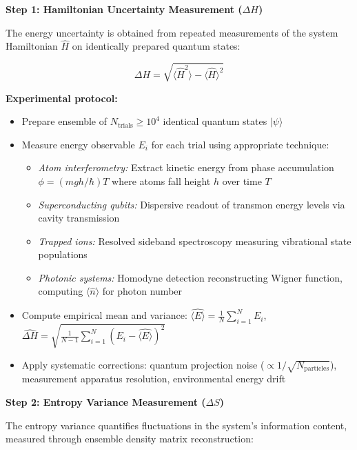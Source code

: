\documentclass[11pt,a4paper,twoside]{article}
\begin{document}
\begin{tcolorbox}[colback=blue!5!white,colframe=blue!75!black,title=\textbf{K-Parameter Estimator Pipeline}]
\textbf{Step 1: Hamiltonian Uncertainty Measurement ($\Delta H$)}

The energy uncertainty is obtained from repeated measurements of the system Hamiltonian $\hat{H}$ on identically prepared quantum states:

\begin{equation}
\Delta H = \sqrt{\langle \hat{H}^2 \rangle - \langle \hat{H} \rangle^2}
\end{equation}

\textbf{Experimental protocol:}
\begin{itemize}[leftmargin=*]
    \item Prepare ensemble of $N_{\text{trials}} \geq 10^4$ identical quantum states $|\psi\rangle$
    \item Measure energy observable $E_i$ for each trial using appropriate technique:
    \begin{itemize}
        \item \textit{Atom interferometry:} Extract kinetic energy from phase accumulation $\phi = (m g h / \hbar) T$ where atoms fall height $h$ over time $T$
        \item \textit{Superconducting qubits:} Dispersive readout of transmon energy levels via cavity transmission
        \item \textit{Trapped ions:} Resolved sideband spectroscopy measuring vibrational state populations
        \item \textit{Photonic systems:} Homodyne detection reconstructing Wigner function, computing $\langle \hat{n} \rangle$ for photon number
    \end{itemize}
    \item Compute empirical mean and variance: $\hat{\langle E \rangle} = \frac{1}{N}\sum_{i=1}^N E_i$, \quad $\widehat{\Delta H} = \sqrt{\frac{1}{N-1}\sum_{i=1}^N (E_i - \hat{\langle E \rangle})^2}$
    \item Apply systematic corrections: quantum projection noise ($\propto 1/\sqrt{N_{\text{particles}}}$), measurement apparatus resolution, environmental energy drift
\end{itemize}

\textbf{Step 2: Entropy Variance Measurement ($\Delta S$)}

The entropy variance quantifies fluctuations in the system's information content, measured through ensemble density matrix reconstruction:


\end{tcolorbox}
\end{document}

